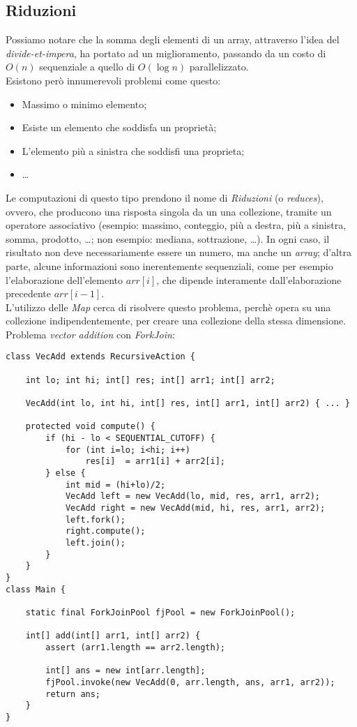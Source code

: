\subsection{Riduzioni}
Possiamo notare che la somma degli elementi di un array, attraverso l'idea del \textit{divide-et-impera}, ha portato ad un miglioramento, passando da un costo di $O(n)$ sequenziale a quello di $O(\log{n})$ parallelizzato. \\
Esistono però innumerevoli problemi come questo:
\begin{itemize}
	\item Massimo o minimo elemento;
	\item Esiste un elemento che soddisfa un proprietà;
	\item L'elemento più a sinistra che soddisfi una proprieta;
	\item \ldots
\end{itemize}
Le computazioni di questo tipo prendono il nome di \textit{Riduzioni} (o \textit{reduces}), ovvero, che producono una risposta singola da un una collezione, tramite un operatore associativo (esempio: massimo, conteggio, più a destra, più a sinistra, somma, prodotto, \ldots; non esempio: mediana, sottrazione, \ldots). In ogni caso, il risultato non deve necessariamente essere un numero, ma anche un \textit{array}; d'altra parte, alcune informazioni sono inerentemente sequenziali, come per esempio l'elaborazione dell'elemento $arr[i]$, che dipende interamente dall'elaborazione precedente $arr[i-1]$. \\
L'utilizzo delle \textit{Map} cerca di risolvere questo problema, perchè opera su una collezione indipendentemente, per creare una collezione della stessa dimensione. \\
Problema \textit{vector addition} con \textit{ForkJoin}:
\begin{lstlisting}
class VecAdd extends RecursiveAction {

	int lo; int hi; int[] res; int[] arr1; int[] arr2;

	VecAdd(int lo, int hi, int[] res, int[] arr1, int[] arr2) { ... }

	protected void compute() {
		if (hi - lo < SEQUENTIAL_CUTOFF) {
			for (int i=lo; i<hi; i++)
				res[i]  = arr1[i] + arr2[i];
		} else {
			int mid = (hi+lo)/2;
			VecAdd left = new VecAdd(lo, mid, res, arr1, arr2);
			VecAdd right = new VecAdd(mid, hi, res, arr1, arr2);
			left.fork();
			right.compute();
			left.join();
		}
	}
}
class Main {

	static final ForkJoinPool fjPool = new ForkJoinPool();

	int[] add(int[] arr1, int[] arr2) {
		assert (arr1.length == arr2.length);

		int[] ans = new int[arr.length];
		fjPool.invoke(new VecAdd(0, arr.length, ans, arr1, arr2));
		return ans;
	}
}
\end{lstlisting}

